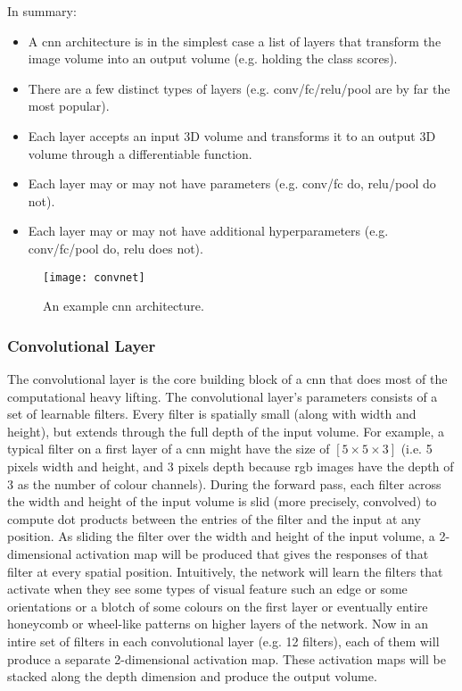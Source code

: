 In summary:
\begin{itemize}
    \item A \acrshort{cnn} architecture is in the simplest case a list of
    layers that transform the image volume into an output volume (e.g. holding
    the class scores).
    \item There are a few distinct types of layers (e.g.
    \acrshort{conv}/\acrshort{fc}/\acrshort{relu}/\acrshort{pool} are by far
    the most popular).
    \item Each layer accepts an input 3D volume and transforms it to an output
    3D volume through a differentiable function.
    \item Each layer may or may not have parameters (e.g.
    \acrshort{conv}/\acrshort{fc} do, \acrshort{relu}/\acrshort{pool} do not).
    \item Each layer may or may not have additional hyperparameters (e.g.
    \acrshort{conv}/\acrshort{fc}/\acrshort{pool} do, \acrshort{relu} does
    not).
\end{itemize}
\begin{figure}[h]
    \centering
    \texttt{[image: convnet]}
    \caption{An example \acrshort{cnn} architecture.}
    \label{fig:web_demo_cnn}
\end{figure}

\subsubsection{Convolutional Layer}
The convolutional layer is the core building block of a \acrlong{cnn} that does
most of the computational heavy lifting. The convolutional layer's parameters
consists of a set of learnable filters. Every filter is spatially small (along
with width and height), but extends through the full depth of the input volume.
For example, a typical filter on a first layer of a \acrshort{cnn} might have
the size of $[5\times5\times3]$ (i.e. 5 pixels width and height, and 3 pixels
depth because \acrshort{rgb} images have the depth of 3 as the number of colour
channels). During the forward pass, each filter across the width and height of
the input volume is slid (more precisely, convolved) to compute dot products
between the entries of the filter and the input at any position. As sliding the
filter over the width and height of the input volume, a 2-dimensional
activation map will be produced that gives the responses of that filter at
every spatial position. Intuitively, the network will learn the filters that
activate when they see some types of visual feature such an edge or some
orientations or a blotch of some colours on the first layer or eventually
entire honeycomb or wheel-like patterns on higher layers of the network. Now in
an intire set of filters in each convolutional layer (e.g. 12 filters), each of
them will produce a separate 2-dimensional activation map. These activation
maps will be stacked along the depth dimension and produce the output volume.



